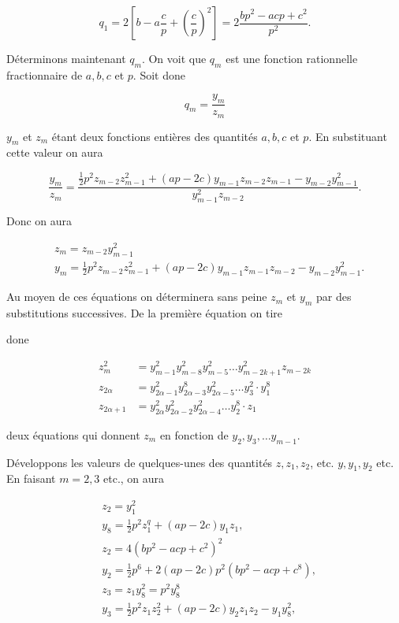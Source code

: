 \documentclass{article}
\begin{document}
\[
q_{1}=2\left[b-a \frac{c}{p}+\left(\frac{c}{p}\right)^{2}\right]=2 \frac{b p^{2}-a c p+c^{2}}{p^{2}} .
\]

Déterminons maintenant \(q_{m}\). On voit que \(q_{m}\) est une fonction rationnelle fractionnaire de \(a, b, c\) et \(p\). Soit done

\[
q_{m}=\frac{y_{m}}{z_{m}}
\]

\(y_{m}\) et \(z_{m}\) étant deux fonctions entières des quantités \(a, b, c\) et \(p\). En substituant cette valeur on aura

\[
\frac{y_{m}}{z_{m}}=\frac{\frac{1}{2} p^{2} z_{m-2} z_{m-1}^{2}+(a p-2 c) y_{m-1} z_{m-2} z_{m-1}-y_{m-2} y_{m-1}^{2}}{y_{m-1}^{2} z_{m-2}} .
\]

Donc on aura

\[
\begin{aligned}
& z_{m}=z_{m-2} y_{m-1}^{2} \\
& y_{m}=\frac{1}{2} p^{2} z_{m-2} z_{m-1}^{2}+(a p-2 c) y_{m-1} z_{m-1} z_{m-2}-y_{m-2} y_{m-1}^{2} .
\end{aligned}
\]

Au moyen de ces équations on déterminera sans peine \(z_{m}\) et \(y_{m}\) par des substitutions successives. De la première équation on tire

done

\[
\begin{aligned}
z_{m}^{2} & =y_{m-1}^{2} y_{m-8}^{2} y_{m-5}^{2} \ldots y_{m-2 k+1}^{2} z_{m-2 k} \\
z_{2 \alpha} & =y_{2 \alpha-1}^{2} y_{2 \alpha-3}^{8} y_{2 \alpha-5}^{2} \ldots y_{3}^{2} \cdot y_{1}^{8} \\
z_{2 \alpha+1} & =y_{2 \alpha}^{2} y_{2 \alpha-2}^{2} y_{2 \alpha-4}^{2} \ldots y_{2}^{8} \cdot z_{1}
\end{aligned}
\]

deux équations qui donnent \(z_{m}\) en fonction de \(y_{2}, y_{3}, \ldots y_{m-1}\).

Développons les valeurs de quelques-unes des quantités \(z, z_{1}, z_{2}\), etc. \(y, y_{1}, y_{2}\) etc. En faisant \(m=2,3\) etc., on aura

\[
\begin{aligned}
& z_{2}=y_{1}^{2} \\
& y_{8}=\frac{1}{2} p^{2} z_{1}^{q}+(a p-2 c) y_{1} z_{1}, \\
& z_{2}=4\left(b p^{2}-a c p+c^{2}\right)^{2} \\
& y_{2}=\frac{1}{2} p^{6}+2(a p-2 c) p^{2}\left(b p^{2}-a c p+c^{8}\right), \\
& z_{3}=z_{1} y_{8}^{2}=p^{2} y_{8}^{8} \\
& y_{3}=\frac{1}{2} p^{2} z_{1} z_{2}^{2}+(a p-2 c) y_{2} z_{1} z_{2}-y_{1} y_{8}^{2},
\end{aligned}
\]
\end{document}
